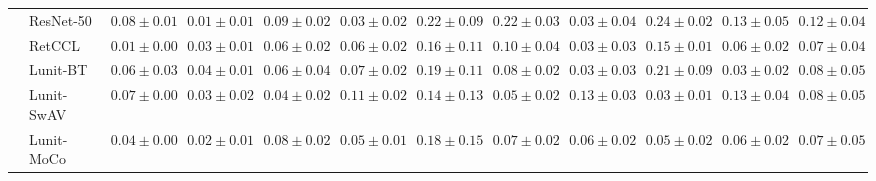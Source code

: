 \begin{tabular}{ll|cccc|c|cccc|c}
 & ResNet-50 & $0.08 \pm 0.01$ & $\mathbf{0.01 \pm 0.01}$ & $0.09 \pm 0.02$ & $0.03 \pm 0.02$ & $0.22 \pm 0.09$ & $0.22 \pm 0.03$ & $0.03 \pm 0.04$ & $0.24 \pm 0.02$ & $0.13 \pm 0.05$ & $0.12 \pm 0.04$ \\
 & RetCCL & $0.01 \pm 0.00$ & $0.03 \pm 0.01$ & $0.06 \pm 0.02$ & $0.06 \pm 0.02$ & $0.16 \pm 0.11$ & $0.10 \pm 0.04$ & $0.03 \pm 0.03$ & $0.15 \pm 0.01$ & $0.06 \pm 0.02$ & $0.07 \pm 0.04$ \\
 & Lunit-BT & $0.06 \pm 0.03$ & $0.04 \pm 0.01$ & $0.06 \pm 0.04$ & $0.07 \pm 0.02$ & $0.19 \pm 0.11$ & $0.08 \pm 0.02$ & $0.03 \pm 0.03$ & $0.21 \pm 0.09$ & $0.03 \pm 0.02$ & $0.08 \pm 0.05$ \\
 & Lunit-SwAV & $0.07 \pm 0.00$ & $0.03 \pm 0.02$ & $0.04 \pm 0.02$ & $0.11 \pm 0.02$ & $0.14 \pm 0.13$ & $0.05 \pm 0.02$ & $0.13 \pm 0.03$ & $0.03 \pm 0.01$ & $0.13 \pm 0.04$ & $0.08 \pm 0.05$ \\
 & Lunit-MoCo & $0.04 \pm 0.00$ & $0.02 \pm 0.01$ & $0.08 \pm 0.02$ & $0.05 \pm 0.01$ & $0.18 \pm 0.15$ & $0.07 \pm 0.02$ & $0.06 \pm 0.02$ & $0.05 \pm 0.02$ & $0.06 \pm 0.02$ & $0.07 \pm 0.05$ \\
\cline{1-12}
\bottomrule
\end{tabular}
